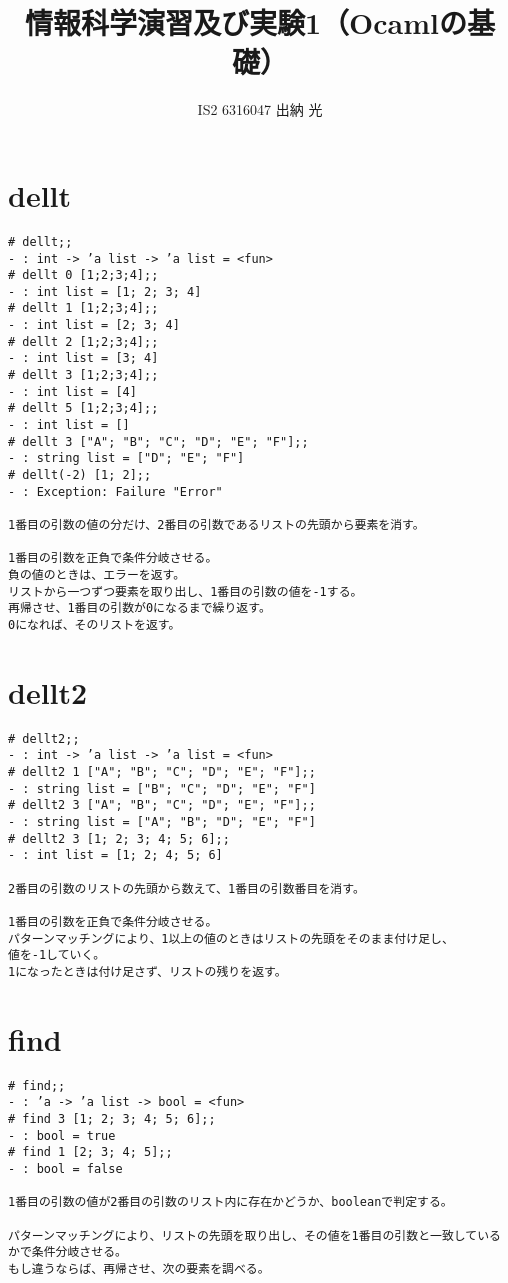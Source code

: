 \documentclass{jarticle}
\title{情報科学演習及び実験1（Ocamlの基礎）}
\author{IS2 6316047 出納 光}
\begin{document}
\maketitle

\section{dellt}
\begin{verbatim}
# dellt;;
- : int -> ’a list -> ’a list = <fun> 
# dellt 0 [1;2;3;4];;
- : int list = [1; 2; 3; 4]
# dellt 1 [1;2;3;4];;
- : int list = [2; 3; 4]
# dellt 2 [1;2;3;4];;
- : int list = [3; 4]
# dellt 3 [1;2;3;4];;
- : int list = [4]
# dellt 5 [1;2;3;4];;
- : int list = []
# dellt 3 ["A"; "B"; "C"; "D"; "E"; "F"];;
- : string list = ["D"; "E"; "F"]
# dellt(-2) [1; 2];;
- : Exception: Failure "Error"

1番目の引数の値の分だけ、2番目の引数であるリストの先頭から要素を消す。

1番目の引数を正負で条件分岐させる。
負の値のときは、エラーを返す。
リストから一つずつ要素を取り出し、1番目の引数の値を-1する。
再帰させ、1番目の引数が0になるまで繰り返す。
0になれば、そのリストを返す。
\end{verbatim}

\newpage
\section{dellt2}
\begin{verbatim}
# dellt2;;
- : int -> ’a list -> ’a list = <fun>
# dellt2 1 ["A"; "B"; "C"; "D"; "E"; "F"];;
- : string list = ["B"; "C"; "D"; "E"; "F"]
# dellt2 3 ["A"; "B"; "C"; "D"; "E"; "F"];;
- : string list = ["A"; "B"; "D"; "E"; "F"]
# dellt2 3 [1; 2; 3; 4; 5; 6];;
- : int list = [1; 2; 4; 5; 6]

2番目の引数のリストの先頭から数えて、1番目の引数番目を消す。

1番目の引数を正負で条件分岐させる。
パターンマッチングにより、1以上の値のときはリストの先頭をそのまま付け足し、
値を-1していく。
1になったときは付け足さず、リストの残りを返す。
\end{verbatim}

\newpage
\section{find}
\begin{verbatim}
# find;;    
- : ’a -> ’a list -> bool = <fun> 
# find 3 [1; 2; 3; 4; 5; 6];;    
- : bool = true    
# find 1 [2; 3; 4; 5];;    
- : bool = false

1番目の引数の値が2番目の引数のリスト内に存在かどうか、booleanで判定する。

パターンマッチングにより、リストの先頭を取り出し、その値を1番目の引数と一致しているかで条件分岐させる。
もし違うならば、再帰させ、次の要素を調べる。
\end{verbatim}
\end{document}

